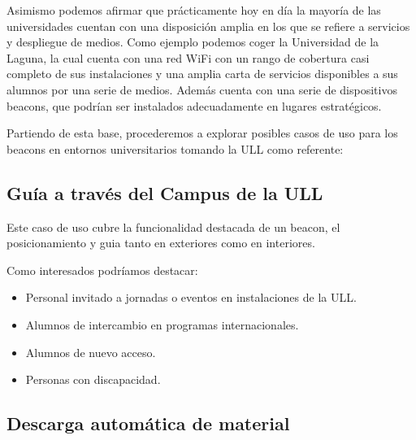 Asimismo podemos afirmar que prácticamente hoy en día la mayoría de las universidades cuentan con una disposición amplia en los que se refiere a servicios y despliegue de medios. Como ejemplo podemos coger la Universidad de la Laguna, la cual cuenta con una red WiFi con un rango de cobertura casi completo de sus instalaciones y una amplia carta de servicios disponibles a sus alumnos por una serie de medios. Además cuenta con una serie de dispositivos beacons, que podrían ser instalados adecuadamente en lugares estratégicos. 

Partiendo de esta base, procederemos a explorar posibles casos de uso para los beacons en entornos universitarios tomando la ULL como referente:

\subsection{Guía a través del Campus de la ULL}

Este caso de uso cubre la funcionalidad destacada de un beacon, el posicionamiento y guia tanto en exteriores como en interiores. 

Como interesados podríamos destacar: 

\begin{itemize}
\item Personal invitado a jornadas o eventos en instalaciones de la ULL.
\item Alumnos de intercambio en programas internacionales.
\item Alumnos de nuevo acceso.
\item Personas con discapacidad.
\end{itemize}

\subsection{Descarga automática de material}

\subsection{}

\subsection{}

\subsection{}

